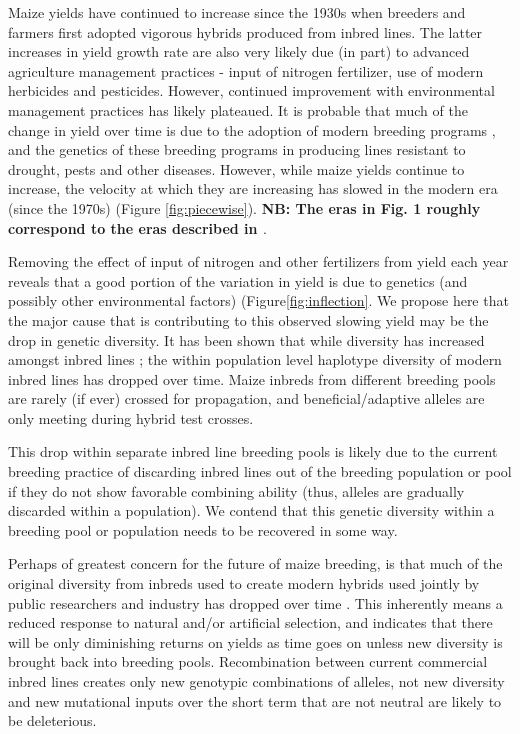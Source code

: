 \documentclass[12pt]{article}
\begin{document}
\par Maize yields have continued to increase since the 1930s when breeders and farmers first adopted vigorous hybrids produced from inbred lines. The latter increases in yield growth rate are also very likely due (in part) to advanced agriculture management practices - input of nitrogen fertilizer, use of modern herbicides and pesticides. However, continued improvement with environmental management practices has likely plateaued. It is probable that much of the change in yield over time is due to the adoption of modern breeding programs \citep{Duvick:2001fy}, and the genetics of these breeding programs in producing lines resistant to drought, pests and other diseases. However, while maize yields continue to increase, the velocity at which they are increasing has slowed in the modern era (since the 1970s) (Figure \ref{fig:piecewise}). \textbf{NB: The eras in Fig. 1 roughly correspond to the eras described in \citep{vanHeerwaarden:2012im}}.
\par Removing the effect of input of nitrogen and other fertilizers from yield each year reveals that a good portion of the variation in yield is due to genetics (and possibly other environmental factors) (Figure\ref{fig:inflection}. 
We propose here that the major cause that is contributing to this observed slowing yield may be the drop in genetic diversity. It has been shown that while diversity has increased amongst inbred lines \citep{Gerke:2013tw}; the within population level haplotype diversity of modern inbred lines \citep{vanHeerwaarden:2012im} has dropped over time. Maize inbreds from different breeding pools are rarely (if ever) crossed for propagation, and beneficial/adaptive alleles are only meeting during hybrid test crosses. 
\par This drop within separate inbred line breeding pools is likely due to the current breeding practice of discarding inbred lines out of the breeding population or pool if they do not show favorable combining ability (thus, alleles are gradually discarded within a population).  We contend that this genetic diversity within a breeding pool or population needs to be recovered in some way.  
\par Perhaps of greatest concern for the future of maize breeding, is that much of the original diversity from inbreds used to create modern hybrids used jointly by public researchers and industry has dropped over time \citep{Gerke:2013tw}. This inherently means a reduced response to natural and/or artificial selection, and indicates that there will be only diminishing returns on yields as time goes on unless new diversity is brought back into breeding pools. Recombination between current commercial inbred lines creates only new genotypic combinations of alleles, not new diversity and new mutational inputs over the short term that are not neutral are likely to be deleterious.
\end{document}
